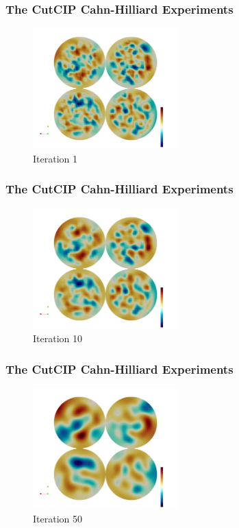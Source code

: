 \begin{frame}
\frametitle{The CutCIP Cahn-Hilliard Experiments}

\begin{figure}[h]
    \centering
    \includegraphics[width=0.5\textwidth]{CH-example/1.png}
    \caption{Iteration 1}
\end{figure}
\end{frame}

\begin{frame}
\frametitle{The CutCIP Cahn-Hilliard Experiments}
\begin{figure}[h]
    \centering
    \includegraphics[width=0.5\textwidth]{CH-example/10.png}
    \caption{Iteration 10}
\end{figure}
\end{frame}

\begin{frame}
\frametitle{The CutCIP Cahn-Hilliard Experiments}
\begin{figure}[h]
    \centering
    \includegraphics[width=0.5\textwidth]{CH-example/50.png}
    \caption{Iteration 50}
\end{figure}
\end{frame}

